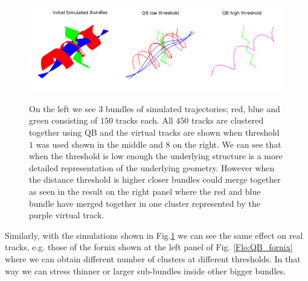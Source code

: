 \documentclass[preprint,authoryear,a4paper,10pt,onecolumn]{elsarticle}
\begin{document}
%
\begin{figure}
\begin{centering}
\label{Flo:simulated_orbits}\includegraphics[scale=0.7]{last_figures/helix_phantom}
\par\end{centering}

\caption{On the left we see $3$ bundles of simulated trajectories; red,
  blue and green consisting of $150$ tracks each. All $450$ tracks are
  clustered together using QB and the virtual tracks are shown when
  threshold $1$ was used shown in the middle and $8$ on the right.  We
  can see that when the threshold is low enough the underlying structure
  is a more detailed representation of the underlying geometry. However
  when the distance threshold is higher closer bundles could merge
  together as seen in the result on the right panel where the red and
  blue bundle have merged together in one cluster represented by the
  purple virtual track.}

\end{figure}


Similarly, with the simulations shown in Fig.\ref{Flo:simulated_orbits}
we can see the same effect on real tracks, e.g. those of the fornix
shown at the left panel of Fig. \ref{Flo:QB_fornix} where we can obtain
different number of clusters at different thresholds. In that way we can
stress thinner or larger sub-bundles inside other bigger bundles.
\end{document}
